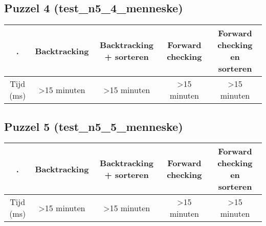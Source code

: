 \documentclass[]{report}
\begin{document}
\begin{appendices}
\subsection{Puzzel 4 (test\_n5\_4\_menneske)}
\begin{tabular}{|c||c|c|c|c|}
\hline . & Backtracking & Backtracking + sorteren & Forward checking & Forward checking en sorteren \\ 
\hline \hline Tijd (ms) & \textgreater 15 minuten & \textgreater 15 minuten & \textgreater 15 minuten & \textgreater 15 minuten \\ 
\hline 
\end{tabular}
\subsection{Puzzel 5 (test\_n5\_5\_menneske)}
\begin{tabular}{|c||c|c|c|c|}
\hline . & Backtracking & Backtracking + sorteren & Forward checking & Forward checking en sorteren \\ 
\hline \hline Tijd (ms) & \textgreater 15 minuten & \textgreater 15 minuten & \textgreater 15 minuten & \textgreater 15 minuten \\ 
\hline 
\end{tabular}

\end{appendices}
\end{document}
